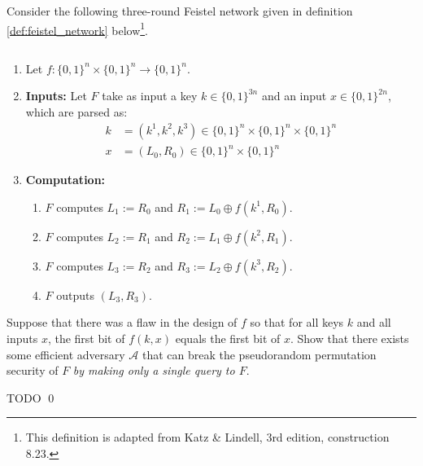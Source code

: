 \documentclass[11pt]{article}
\newenvironment{solution}{\noindent{\bf Solution}\hspace*{1em}}{\qed\medskip}
\newcommand{\A}{\mathcal{A}}
\begin{document}
Consider the following three-round Feistel network given in definition \ref{def:feistel_network} below\footnote{This definition is adapted from Katz \& Lindell, 3rd edition, construction 8.23.}.
\begin{definition}\label{def:feistel_network}
$ $
\begin{enumerate}
    \item Let $f: \{0,1\}^n \times \{0,1\}^{n}\to \{0,1\}^n$.
    \item \textbf{Inputs:} Let $F$ take as input a key $k \in \{0,1\}^{3n}$ and an input $x \in \{0,1\}^{2n}$, which are parsed as:
    \begin{align*}
        k &= (k^1, k^2, k^3) \in \{0,1\}^n \times \{0,1\}^n \times \{0,1\}^n\\
        x &= (L_0, R_0) \in \{0,1\}^{n} \times \{0,1\}^n
    \end{align*}
    \item \textbf{Computation:}
    \begin{enumerate}
        \item $F$ computes $L_1 := R_0$ and $R_1 := L_0 \oplus f(k^1, R_0)$.
        \item $F$ computes $L_2 := R_1$ and $R_2 := L_1 \oplus f(k^2, R_1)$.
        \item $F$ computes $L_3 := R_2$ and $R_3 := L_2 \oplus f(k^3, R_2)$.
        \item $F$ outputs $(L_3, R_3)$.
    \end{enumerate}
\end{enumerate}
\end{definition}

Suppose that there was a flaw in the design of $f$ so that for all keys $k$ and all inputs $x$, the first bit of $f(k, x)$ equals the first bit of $x$. Show that there exists some efficient adversary $\A$ that can break the pseudorandom permutation security of $F$ \textit{by making only a single query to $F$}.\newline

\begin{solution}
    TODO
\end{solution}
\end{document}
